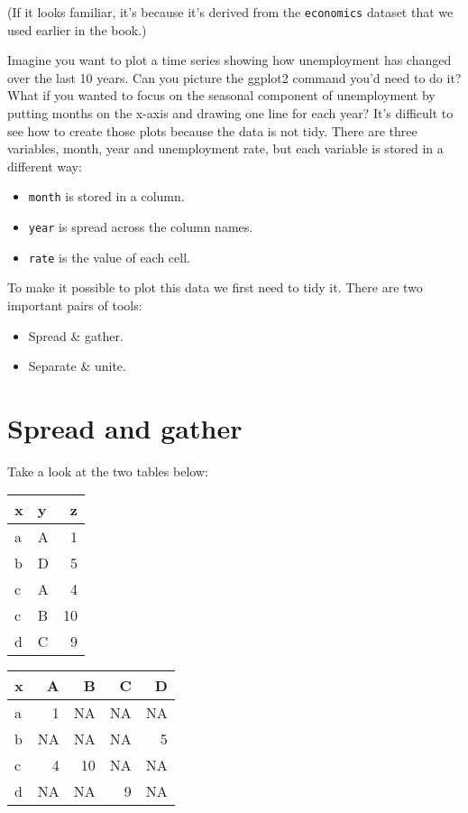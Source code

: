 (If it looks familiar, it's because it's derived from the
\texttt{economics} dataset that we used earlier in the book.)

Imagine you want to plot a time series showing how unemployment has
changed over the last 10 years. Can you picture the ggplot2 command
you'd need to do it? What if you wanted to focus on the seasonal
component of unemployment by putting months on the x-axis and drawing
one line for each year? It's difficult to see how to create those plots
because the data is not tidy. There are three variables, month, year and
unemployment rate, but each variable is stored in a different way:

\begin{itemize}
\tightlist
\item
  \texttt{month} is stored in a column.
\item
  \texttt{year} is spread across the column names.
\item
  \texttt{rate} is the value of each cell.
\end{itemize}

To make it possible to plot this data we first need to tidy it. There
are two important pairs of tools:

\begin{itemize}
\tightlist
\item
  Spread \& gather.
\item
  Separate \& unite.
\end{itemize}

\section{Spread and gather}\label{sec:spread-gather}

Take a look at the two tables below:

\begin{longtable}[c]{@{}llr@{}}
\toprule
x & y & z\tabularnewline
\midrule
\endhead
a & A & 1\tabularnewline
b & D & 5\tabularnewline
c & A & 4\tabularnewline
c & B & 10\tabularnewline
d & C & 9\tabularnewline
\bottomrule
\end{longtable}

\begin{longtable}[c]{@{}lrrrr@{}}
\toprule
x & A & B & C & D\tabularnewline
\midrule
\endhead
a & 1 & NA & NA & NA\tabularnewline
b & NA & NA & NA & 5\tabularnewline
c & 4 & 10 & NA & NA\tabularnewline
d & NA & NA & 9 & NA\tabularnewline
\bottomrule
\end{longtable}

